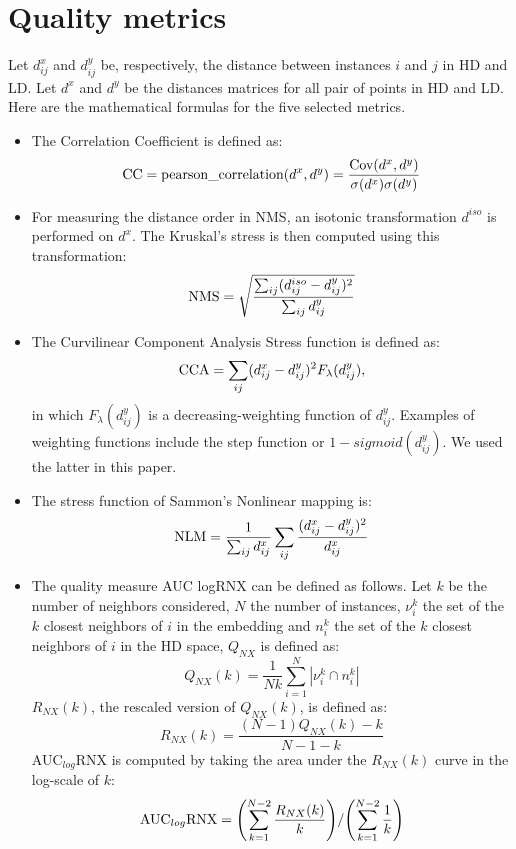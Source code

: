\section{Quality metrics}\label{appendix:qual_metrics}
Let $d^{x}_{ij}$ and $d^{y}_{ij}$ be, respectively, the distance between instances $i$ and $j$ in HD and LD.
Let $d^x$ and $d^y$ be the distances matrices for all pair of points in HD and LD.
Here are the mathematical formulas for the five selected metrics.

\begin{itemize}
    \item The Correlation Coefficient is defined as:
        $$
        \textnormal{CC} = \textnormal{pearson\_correlation}(d^x, d^y) = \frac{\textnormal{Cov}(d^x, d^y)}{\sigma(d^x)\sigma(d^y)}
        $$
    \item For measuring the distance order in NMS, an isotonic transformation $d^{iso}$ is performed on $d^x$. The Kruskal's stress is then computed using this transformation:
        $$ 
        \textnormal{NMS} = \sqrt{\frac
            { \sum_{ij} (d^{iso}_{ij} - d^{y}_{ij})^2 }
            { \sum_{ij} d^{y}_{ij} } }
        $$
    \item The Curvilinear Component Analysis Stress function is defined as:
        $$
        \textnormal{CCA} = \sum_{ij} (d^{x}_{ij} - d^{y}_{ij})^2 F_{\lambda}(d^{y}_{ij}),
        $$
        in which $F_{\lambda}(d^{y}_{ij})$ is a decreasing-weighting function of $d^{y}_{ij}$.
        Examples of weighting functions include
        the step function or $1-sigmoid(d^{y}_{ij})$. We used the latter in this paper.
    \item The stress function of Sammon's Nonlinear mapping is:
        $$ 
        \textnormal{NLM} = \frac{1}{\sum_{ij} d^{x}_{ij}}
            \sum_{ij} \frac{ (d^{x}_{ij} - d^{y}_{ij})^2 }{d^{x}_{ij}}
        $$
    \item The quality measure AUC logRNX can be defined as follows.
        Let $k$ be the number of neighbors considered, $N$ the number of instances, $\nu_{i}^{k}$ the set of the $k$ closest neighbors of $i$ in the embedding and $n_{i}^{k}$ the set of the $k$ closest neighbors of $i$ in the HD space, $Q_{NX}$ is defined as: 
            $$
            Q_{NX}(k)= \frac{1}{Nk} \sum_{i=1}^{N} |\nu_{i}^{k} \cap n_{i}^{k}| 
            $$
        $R_{NX}(k)$, the rescaled version of $Q_{NX}(k)$, is defined as:
            $$ 
            R_{NX}(k) =  \frac{(N-1) Q_{NX}(k) - k}{N - 1 - k} 
            $$
        AUC$_{log}$RNX is computed by taking the area under the $R_{NX}(k)$ curve in the log-scale of $k$:
            $$
            \textnormal{AUC}_{log}\textnormal{RNX} =
                {\left(\sum_{k=1}^{N-2} \frac{R_{NX}(k)}{k} \right)} /
                {\left(\sum_{k=1}^{N-2}\frac{1}{k}\right)}
        $$
\end{itemize}


